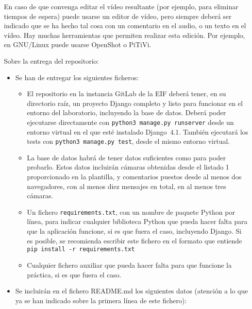 \begin{enumerate}
En caso de que convenga editar el vídeo resultante (por ejemplo, para eliminar tiempos de espera) puede usarse un editor de vídeo, pero siempre deberá ser indicado que se ha hecho tal cosa con un comentario en el audio, o un texto en el vídeo. Hay muchas herramientas que permiten realizar esta edición. Por ejemplo, en GNU/Linux puede usarse OpenShot o PiTiVi.

\end{enumerate}

Sobre la entrega del repositorio:
\begin{itemize}
  \item Se han de entregar los siguientes ficheros:

\begin{itemize}
\item El repositorio en la instancia GitLab de la EIF deberá tener, en su directorio raíz, un proyecto Django completo y listo para funcionar en el entorno del laboratorio, incluyendo la base de datos. Deberá poder ejecutarse directamente con \verb|python3 manage.py runserver| desde un entorno virtual en el que esté instalado Django~4.1. También ejecutará los tests con \verb|python3 manage.py test|, desde el mismo entorno virtual.

\item La base de datos habrá de tener datos suficientes como para poder probarlo. Estos datos incluirán cámaras obtenidas desde el listado 1 proporcionado en la plantilla, y comentarios puestos desde al menos dos navegadores, con al menos diez mensajes en total, en al menos tres cámaras.

\item Un fichero \verb|requirements.txt|, con un nombre de paquete Python por línea, para indicar cualquier biblioteca Python que pueda hacer falta para que la aplicación funcione, si es que fuera el caso, incluyendo Django. Si es posible, se recomienda escribir este fichero en el formato que entiende \verb|pip install -r requirements.txt|

\item Cualquier fichero auxiliar que pueda hacer falta para que funcione la práctica, si es que fuera el caso.
\end{itemize}

\item Se incluirán en el fichero README.md los siguientes datos (atención a lo que ya se han indicado sobre la primera línea de este fichero):


\end{itemize}
